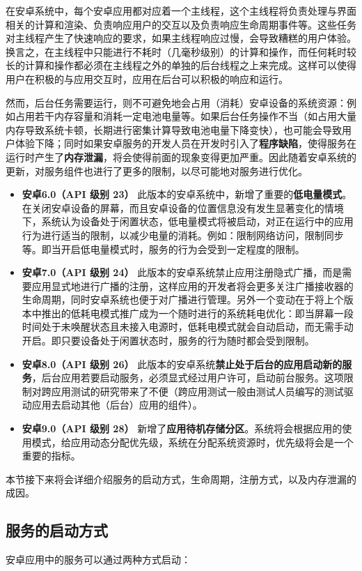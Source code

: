 在安卓系统中，每个安卓应用都对应着一个主线程，这个主线程将负责处理与界面相关的计算和渲染、负责响应用户的交互以及负责响应生命周期事件等。这些任务对主线程产生了快速响应的要求，如果主线程响应过慢，会导致糟糕的用户体验。换言之，在主线程中只能进行不耗时（几毫秒级别）的计算和操作，而任何耗时较长的计算和操作都必须在主线程之外的单独的后台线程之上来完成。这样可以使得用户在积极的与应用交互时，应用在后台可以积极的响应和运行。

然而，后台任务需要运行，则不可避免地会占用（消耗）安卓设备的系统资源：例如占用若干内存容量和消耗一定电池电量等。如果后台任务操作不当（如占用大量内存导致系统卡顿，长期进行密集计算导致电池电量下降变快），也可能会导致用户体验下降；同时如果安卓服务的开发人员在开发时引入了\textbf{程序缺陷}，使得服务在运行时产生了\textbf{内存泄漏}，将会使得前面的现象变得更加严重。因此随着安卓系统的更新，对服务组件也进行了更多的限制，以尽可能地对服务进行优化。

\begin{itemize}
	\item \textbf{安卓6.0（API 级别 23） } 此版本的安卓系统中，新增了重要的\textbf{低电量模式}。在关闭安卓设备的屏幕，而且安卓设备的位置信息没有发生显著变化的情境下，系统认为设备处于闲置状态，低电量模式将被启动，对正在运行中的应用行为进行适当的限制，以减少电量的消耗。例如：限制网络访问，限制同步等。即当开启低电量模式时，服务的行为会受到一定程度的限制。
	\item \textbf{安卓7.0（API 级别 24）} 此版本的安卓系统禁止应用注册隐式广播，而是需要应用显式地进行广播的注册，这样应用的开发者将会更多关注广播接收器的生命周期，同时安卓系统也便于对广播进行管理。另外一个变动在于将上个版本中推出的低耗电模式推广成为一个随时进行的系统耗电优化：即当屏幕一段时间处于未唤醒状态且未接入电源时，低耗电模式就会自动启动，而无需手动开启。即只要设备处于闲置状态时，服务的行为随时都会受到限制。
	\item \textbf{安卓8.0（API 级别 26）} 此版本的安卓系统\textbf{禁止处于后台的应用启动新的服务}，后台应用若要启动服务，必须显式经过用户许可，启动前台服务。这项限制对跨应用测试的研究带来了不便（跨应用测试一般由测试人员编写的测试驱动应用去启动其他（后台）应用的组件）。
	\item \textbf{安卓9.0（API 级别 28）} 新增了\textbf{应用待机存储分区}。系统将会根据应用的使用模式，给应用动态分配优先级，系统在分配系统资源时，优先级将会是一个重要的指标。
\end{itemize}

本节接下来将会详细介绍服务的启动方式，生命周期，注册方式，以及内存泄漏的成因。

\subsection{服务的启动方式}
安卓应用中的服务可以通过两种方式启动\cite{service}：

